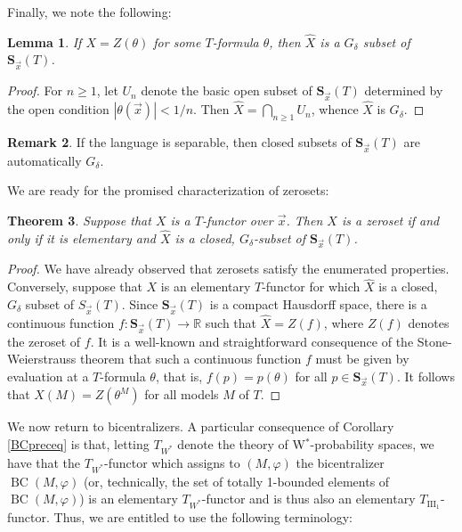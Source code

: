 \documentclass[12pt]{amsart}
\newtheorem{thm}{Theorem}[section]
\newtheorem{lem}[thm]{Lemma}
\theoremstyle{definition}
\newtheorem{remark}[thm]{Remark}
\def\bb{\mathbb}
\def\bb{\mathbb}
\def\BC{\operatorname{BC}}
\begin{document}
Finally, we note the following:

\begin{lem}
If $X=Z(\theta)$ for some $T$-formula $\theta$, then $\hat X$ is a $G_\delta$ subset of $\mathbf{S}_{\vec x}(T)$.
\end{lem}

\begin{proof}
For $n\geq 1$, let $U_n$ denote the basic open subset of $\mathbf{S}_{\vec x}(T)$ determined by the open condition $|\theta(\vec x)|<1/n$.  Then $\hat X=\bigcap_{n\geq 1} U_n$, whence $\hat X$ is $G_\delta$.  
\end{proof}

\begin{remark}\label{separableremark}
If the language is separable, then closed subsets of $\mathbf{S}_{\vec x}(T)$ are automatically $G_\delta$.
\end{remark}

We are ready for the promised characterization of zerosets:

\begin{thm}\label{zerosetcharacterization}
Suppose that $X$ is a $T$-functor over $\vec x$.  Then $X$ is a zeroset if and only if it is elementary and $\hat X$ is a closed, $G_\delta$-subset of $\mathbf{S}_{\vec x}(T)$.
\end{thm}

\begin{proof}
We have already observed that zerosets satisfy the enumerated properties.  Conversely, suppose that $X$ is an elementary $T$-functor for which $\hat X$ is a closed, $G_\delta$ subset of $S_{\vec x}(T)$.  Since $\mathbf{S}_{\vec x}(T)$ is a compact Hausdorff space, there is a continuous function $f:\mathbf{S}_{\vec x}(T)\to \bb R$ such that $\hat X=Z(f)$, where $Z(f)$ denotes the zeroset of $f$.  It is a well-known and straightforward consequence of the Stone-Weierstrauss theorem that such a continuous function $f$ must be given by evaluation at a $T$-formula $\theta$, that is, $f(p)=p(\theta)$ for all $p\in \mathbf{S}_{\vec x}(T)$.  It follows that $X(M)=Z(\theta^M)$ for all models $M$ of $T$. 
\end{proof}

We now return to bicentralizers.  A particular consequence of Corollary \ref{BCpreceq} is that, letting $T_{W^*}$ denote the theory of W$^*$-probability spaces, we have that the $T_{W^*}$-functor which assigns to $(M,\varphi)$ the bicentralizer $\BC(M,\varphi)$ (or, technically, the set of totally 1-bounded elements of $\BC(M,\varphi)$) is an elementary $T_{W^*}$-functor and is thus also an elementary $T_{\mathrm{III}_1}$-functor.  Thus, we are entitled to use the following terminology: 
\end{document}
